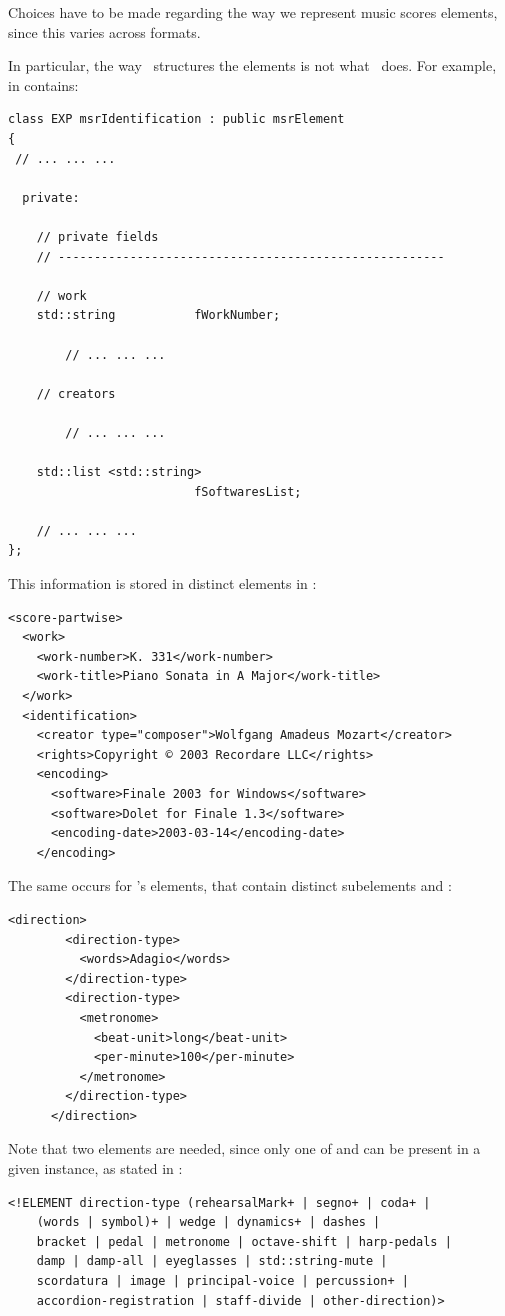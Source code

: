 Choices have to be made regarding the way we represent music scores elements, since this varies across formats.

In particular, the way \mxml\ structures the elements is not what \msrRepr\ does. For example,  in  contains:
\begin{lstlisting}[language=CPlusPlus]
class EXP msrIdentification : public msrElement
{
 // ... ... ...

  private:

    // private fields
    // ------------------------------------------------------

    // work
    std::string           fWorkNumber;

		// ... ... ...

    // creators

		// ... ... ...

    std::list <std::string>
                          fSoftwaresList;

	// ... ... ...
};
\end{lstlisting}

This information is stored in distinct elements in \mxml:
\begin{lstlisting}[language=MusicXML]
<score-partwise>
  <work>
    <work-number>K. 331</work-number>
    <work-title>Piano Sonata in A Major</work-title>
  </work>
  <identification>
    <creator type="composer">Wolfgang Amadeus Mozart</creator>
    <rights>Copyright © 2003 Recordare LLC</rights>
    <encoding>
      <software>Finale 2003 for Windows</software>
      <software>Dolet for Finale 1.3</software>
      <encoding-date>2003-03-14</encoding-date>
    </encoding>
\end{lstlisting}

The same occurs for \mxml's  elements, that contain distinct subelements  and :
\begin{lstlisting}[language=MusicXML]
      <direction>
        <direction-type>
          <words>Adagio</words>
        </direction-type>
        <direction-type>
          <metronome>
            <beat-unit>long</beat-unit>
            <per-minute>100</per-minute>
          </metronome>
        </direction-type>
      </direction>
\end{lstlisting}

Note that two  elements are needed, since only one of  and  can be present in a given instance, as stated in :
\begin{lstlisting}[language=MusicXML]
<!ELEMENT direction-type (rehearsalMark+ | segno+ | coda+ |
	(words | symbol)+ | wedge | dynamics+ | dashes |
	bracket | pedal | metronome | octave-shift | harp-pedals |
	damp | damp-all | eyeglasses | std::string-mute |
	scordatura | image | principal-voice | percussion+ |
	accordion-registration | staff-divide | other-direction)>
\end{lstlisting}

